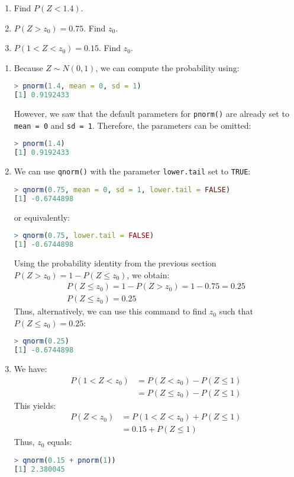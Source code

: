 \begin{exmp}
    \begin{enumerate}
        \item Find \( P(Z < 1.4) \).
        \item \( P(Z > z_0) = 0.75 \). Find \( z_0 \).
        \item \( P(1 < Z < z_0) = 0.15 \). Find \( z_0 \).
    \end{enumerate}
\end{exmp}
\begin{solution}
    \begin{enumerate}
        \item Because \( Z \sim N(0, 1) \), we can compute the probability using:
    \begin{lstlisting}[language=R]
> pnorm(1.4, mean = 0, sd = 1)
[1] 0.9192433      
    \end{lstlisting}
    However, we saw that the default parameters for \verb|pnorm()| are already set to \verb|mean = 0| and \verb|sd = 1|.
    Therefore, the parameters can be omitted:
    \begin{lstlisting}[language=R]
> pnorm(1.4)
[1] 0.9192433      
    \end{lstlisting}
    \item We can use \verb|qnorm()| with the parameter \verb|lower.tail| set to \verb|TRUE|:
    \begin{lstlisting}[language=R]
> qnorm(0.75, mean = 0, sd = 1, lower.tail = FALSE)
[1] -0.6744898
    \end{lstlisting}
    or equivalently:
    \begin{lstlisting}[language=R]
> qnorm(0.75, lower.tail = FALSE)
[1] -0.6744898
    \end{lstlisting}
    Using the probability identity from the previous section \( P(Z > z_0) = 1 - P(Z \leq z_0) \), we obtain:
    \begin{gather*}
        P(Z \leq z_0) = 1 - P(Z > z_0) = 1 - 0.75 = 0.25\\
        P(Z \leq z_0) = 0.25
    \end{gather*}
    Thus, alternatively, we can use this command to find \( z_0 \) such that \( P(Z \leq z_0) = 0.25 \):
    \begin{lstlisting}[language=R]
> qnorm(0.25)
[1] -0.6744898
    \end{lstlisting}
    \item We have:
    \begin{align*}
        P(1 < Z < z_0) &= P(Z < z_0) - P(Z \leq 1)\\
        &= P(Z \leq z_0) - P(Z \leq 1)
    \end{align*}
    This yields:
    \begin{align*}
        P(Z < z_0) &= P(1 < Z < z_0) + P(Z \leq 1)\\
        &= 0.15 + P(Z \leq 1)
    \end{align*}
    Thus, \( z_0 \) equals:
    \begin{lstlisting}[language=R]
> qnorm(0.15 + pnorm(1))
[1] 2.380045
    \end{lstlisting}
    \end{enumerate}
\end{solution}

